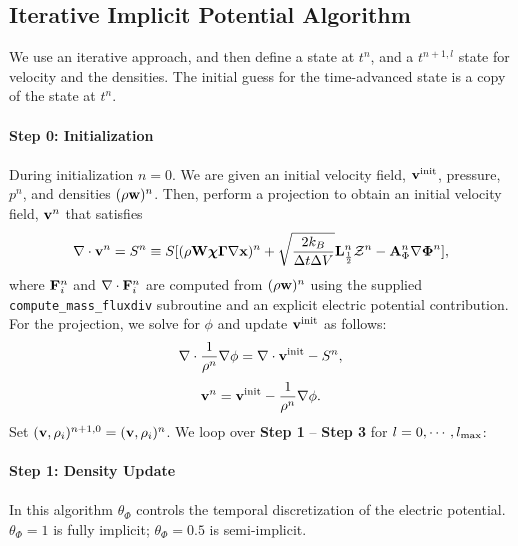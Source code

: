 \documentclass[final]{siamltex}
\def\Ab {{\bf A}}
\def\Fb {{\bf F}}
\def\Lb {{\bf L}}
\def\vb {{\bf v}}
\def\wb {{\bf w}}
\def\Wb {{\bf W}}
\def\xb {{\bf x}}
\def\chib   {\boldsymbol{\chi}}
\def\Gammab {\boldsymbol{\Gamma}}
\def\Phib   {\boldsymbol{\Phi}}
\def\half   {\frac{1}{2}}
\begin{document}
\subsection{Iterative Implicit Potential Algorithm}
We use an iterative approach, and then define a state at $t^n$, and
a $t^{n+1,l}$ state for velocity and the densities.  The initial guess for
the time-advanced state is a copy of the state at $t^n$.\\ \\
{\bf Step 0: Initialization}\\ \\
During initialization $n=0$.
We are given an initial velocity field, $\vb^{\rm init}$, pressure, $p^n$,
and densities $(\rho\wb)^n$.
Then, perform a projection to obtain an initial velocity field, $\vb^n$ that satisfies
\begin{equation}
\nabla\cdot\vb^n = S^n \equiv 
S[(\rho\Wb\chib\Gammab\nabla\xb)^n + \sqrt{\frac{2k_B}{\Delta t\Delta V}}\Lb_\half^n\mathcal{Z}^n - \Ab_\Phi^n\nabla\Phib^n],
\end{equation}
where $\Fb_i^n$ and $\nabla\cdot\Fb_i^n$ are computed from $(\rho\wb)^n$ using the 
supplied {\tt compute\_mass\_fluxdiv} subroutine and an explicit electric
potential contribution.
For the projection, we solve for $\phi$ and update $\vb^{\rm init}$ as follows:
\begin{equation}
\nabla\cdot\frac{1}{\rho^n}\nabla\phi = \nabla\cdot\vb^{\rm init} - S^n,
\end{equation}
\begin{equation}
\vb^n = \vb^{\rm init} - \frac{1}{\rho^n}\nabla\phi.
\end{equation}
Set $(\vb,\rho_i)^{n+1,0} = (\vb,\rho_i)^n$.
We loop over {\bf Step 1} -- {\bf Step 3} for $l=0,\cdots,l_{\rm max}$:\\ \\
{\bf Step 1: Density Update}\\ \\
In this algorithm $\theta_\Phi$ controls
the temporal discretization of the electric potential.  $\theta_\Phi=1$ is fully
implicit; $\theta_\Phi=0.5$ is semi-implicit.\\ \\
\end{document}
